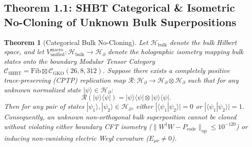 \documentclass[11pt,onecolumn]{article}
\newtheorem{theorem}{Theorem}
\begin{document}
\subsection{Theorem 1.1: SHBT Categorical \& Isometric No-Cloning of Unknown Bulk Superpositions}
\begin{theorem}[Categorical Bulk No-Cloning]
\label{thm:cat_no_clone}
Let $\mathcal{H}_{\text{bulk}}$ denote the bulk Hilbert space, and let $V_{\text{unified}}^{\text{macro}} : \mathcal{H}_{\text{bulk}} \to \mathcal{H}_{\partial}$ denote the holographic isometry mapping bulk states onto the boundary Modular Tensor Category $\mathcal{C}_{\text{SHBT}} = \text{Fib} \boxtimes \mathcal{C}_{\text{GKO}}(26, 8, 312)$. Suppose there exists a completely positive trace-preserving (CPTP) replication map $\mathcal{R} : \mathcal{H}_\partial \to \mathcal{H}_\partial \otimes \mathcal{H}_\partial$ such that for any unknown normalized state $|\psi\rangle \in \mathcal{H}_\partial$:
\begin{equation}
\mathcal{R}(|\psi\rangle\langle\psi|) = |\psi\rangle\langle\psi| \otimes |\psi\rangle\langle\psi|.
\label{eq:cloning_map_hypothesis}
\end{equation}
Then for any pair of states $|\psi_1\rangle, |\psi_2\rangle \in \mathcal{H}_\partial$, either $|\langle\psi_1|\psi_2\rangle| = 0$ or $|\langle\psi_1|\psi_2\rangle| = 1$. Consequently, an unknown non-orthogonal bulk superposition cannot be cloned without violating either boundary CFT isometry ($\|W^\dagger W - P_{\text{code}}\|_{\text{op}} \le 10^{-120}$) or inducing non-vanishing electric Weyl curvature ($E_{\mu\nu} \neq 0$).
\end{theorem}
\end{document}
